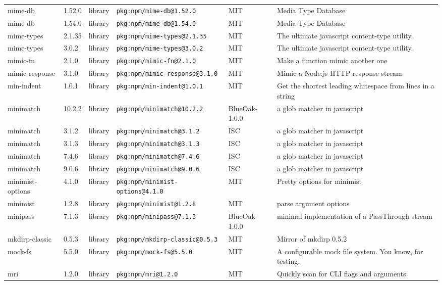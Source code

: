 \documentclass[11pt]{article}
\begin{document}
\begin{longtable}{|l|l|l|p{2.2cm}|l|p{4cm}|}
mime-db & 1.52.0 & library & \texttt{pkg:npm/mime-db@1.52.0} & MIT & Media Type Database \\
mime-db & 1.54.0 & library & \texttt{pkg:npm/mime-db@1.54.0} & MIT & Media Type Database \\
mime-types & 2.1.35 & library & \texttt{pkg:npm/mime-types@2.1.35} & MIT & The ultimate javascript content-type utility. \\
mime-types & 3.0.2 & library & \texttt{pkg:npm/mime-types@3.0.2} & MIT & The ultimate javascript content-type utility. \\
mimic-fn & 2.1.0 & library & \texttt{pkg:npm/mimic-fn@2.1.0} & MIT & Make a function mimic another one \\
mimic-response & 3.1.0 & library & \texttt{pkg:npm/mimic-response@3.1.0} & MIT & Mimic a Node.js HTTP response stream \\
min-indent & 1.0.1 & library & \texttt{pkg:npm/min-indent@1.0.1} & MIT & Get the shortest leading whitespace from lines in a string \\
minimatch & 10.2.2 & library & \texttt{pkg:npm/minimatch@10.2.2} & BlueOak-1.0.0 & a glob matcher in javascript \\
minimatch & 3.1.2 & library & \texttt{pkg:npm/minimatch@3.1.2} & ISC & a glob matcher in javascript \\
minimatch & 3.1.3 & library & \texttt{pkg:npm/minimatch@3.1.3} & ISC & a glob matcher in javascript \\
minimatch & 7.4.6 & library & \texttt{pkg:npm/minimatch@7.4.6} & ISC & a glob matcher in javascript \\
minimatch & 9.0.6 & library & \texttt{pkg:npm/minimatch@9.0.6} & ISC & a glob matcher in javascript \\
minimist-options & 4.1.0 & library & \texttt{pkg:npm/minimist-options@4.1.0} & MIT & Pretty options for minimist \\
minimist & 1.2.8 & library & \texttt{pkg:npm/minimist@1.2.8} & MIT & parse argument options \\
minipass & 7.1.3 & library & \texttt{pkg:npm/minipass@7.1.3} & BlueOak-1.0.0 & minimal implementation of a PassThrough stream \\
mkdirp-classic & 0.5.3 & library & \texttt{pkg:npm/mkdirp-classic@0.5.3} & MIT & Mirror of mkdirp 0.5.2 \\
mock-fs & 5.5.0 & library & \texttt{pkg:npm/mock-fs@5.5.0} & MIT & A configurable mock file system.  You know, for testing. \\
mri & 1.2.0 & library & \texttt{pkg:npm/mri@1.2.0} & MIT & Quickly scan for CLI flags and arguments \\

\end{longtable}
\end{document}
